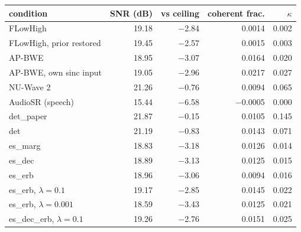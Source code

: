 \begin{tabular}{lrrrr}
\toprule
condition & SNR (dB) & vs ceiling & coherent frac. & $\kappa$ \\
\midrule
FLowHigh & 19.18 & $-$2.84 & 0.0014 & 0.002 \\
FLowHigh, prior restored & 19.45 & $-$2.57 & 0.0015 & 0.003 \\
AP-BWE & 18.95 & $-$3.07 & 0.0164 & 0.020 \\
AP-BWE, own sinc input & 19.05 & $-$2.96 & 0.0217 & 0.027 \\
NU-Wave 2 & 21.26 & $-$0.76 & 0.0094 & 0.065 \\
AudioSR (speech) & 15.44 & $-$6.58 & $-$0.0005 & 0.000 \\
det\_paper & 21.87 & $-$0.15 & 0.0105 & 0.145 \\
det & 21.19 & $-$0.83 & 0.0143 & 0.071 \\
es\_marg & 18.83 & $-$3.18 & 0.0126 & 0.014 \\
es\_dec & 18.89 & $-$3.13 & 0.0125 & 0.015 \\
es\_erb & 18.96 & $-$3.06 & 0.0094 & 0.016 \\
es\_erb, $\lambda{=}0.1$ & 19.17 & $-$2.85 & 0.0145 & 0.022 \\
es\_erb, $\lambda{=}0.001$ & 18.59 & $-$3.43 & 0.0125 & 0.021 \\
es\_dec\_erb, $\lambda{=}0.1$ & 19.26 & $-$2.76 & 0.0151 & 0.025 \\
\bottomrule
\end{tabular}
